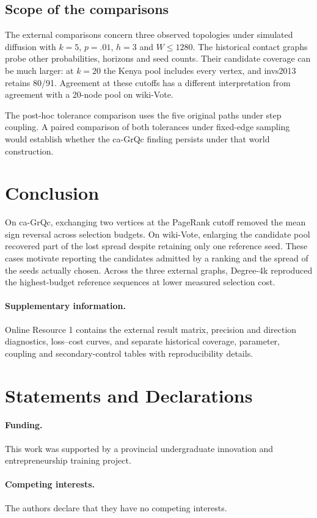 \documentclass[smallextended]{svjour3}
\begin{document}
\subsection{Scope of the comparisons}
The external comparisons concern three observed topologies under simulated diffusion with $k=5$, $p=.01$, $h=3$ and $W\le1280$. The historical contact graphs probe other probabilities, horizons and seed counts. Their candidate coverage can be much larger: at $k=20$ the Kenya pool includes every vertex, and invs2013 retains 80/91. Agreement at these cutoffs has a different interpretation from agreement with a 20-node pool on wiki-Vote.

The post-hoc tolerance comparison uses the five original paths under step coupling. A paired comparison of both tolerances under fixed-edge sampling would establish whether the ca-GrQc finding persists under that world construction.

\section{Conclusion}
On ca-GrQc, exchanging two vertices at the PageRank cutoff removed the mean sign reversal across selection budgets. On wiki-Vote, enlarging the candidate pool recovered part of the lost spread despite retaining only one reference seed. These cases motivate reporting the candidates admitted by a ranking and the spread of the seeds actually chosen. Across the three external graphs, Degree-4k reproduced the highest-budget reference sequences at lower measured selection cost.

\paragraph{Supplementary information.} Online Resource 1 contains the external result matrix, precision and direction diagnostics, loss--cost curves, and separate historical coverage, parameter, coupling and secondary-control tables with reproducibility details.
\section*{Statements and Declarations}
\paragraph{Funding.} This work was supported by a provincial undergraduate innovation and entrepreneurship training project.
\paragraph{Competing interests.} The authors declare that they have no competing interests.
\end{document}
